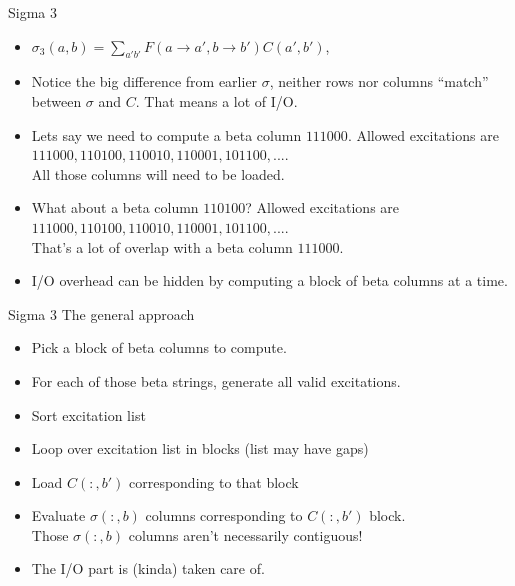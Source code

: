 \documentclass{beamer}
\begin{document}
\begin{frame}[fragile]{Sigma 3}
\begin{itemize}
\item $\sigma_3(a,b) = \sum_{a'b'} F(a \rightarrow a', b \rightarrow b') C(a',b')$, 
\item Notice the big difference from earlier $\sigma$,
  neither rows nor columns ``match'' between $\sigma$ and $C$.
  That means a lot of I/O.
\item Lets say we need to compute a beta column $111000$.  Allowed excitations are  \\
$111000, 110100, 110010, 110001, 101100, ...$. \\
All those columns will need to be loaded.
\item What about a beta column $110100$?  Allowed excitations are \\
$111000, 110100, 110010, 110001, 101100, ...$. \\
That's a lot of overlap with a beta column $111000$.
\item I/O overhead can be hidden by computing a block of beta columns at a time.
\end{itemize}
\end{frame}

\begin{frame}[fragile]{Sigma 3}
 The general approach
\begin{itemize}
\item Pick a block of beta columns to compute.
\item For each of those beta strings, generate all valid excitations.
\item Sort excitation list
\item Loop over excitation list in blocks (list may have gaps)
\item Load $C(:,b')$ corresponding to that block
\item Evaluate $\sigma(:,b)$ columns corresponding to $C(:,b')$ block. \\
  Those $\sigma(:,b)$ columns aren't necessarily contiguous!
\item The I/O part is (kinda) taken care of.
\end{itemize}
\end{frame}
\end{document}
